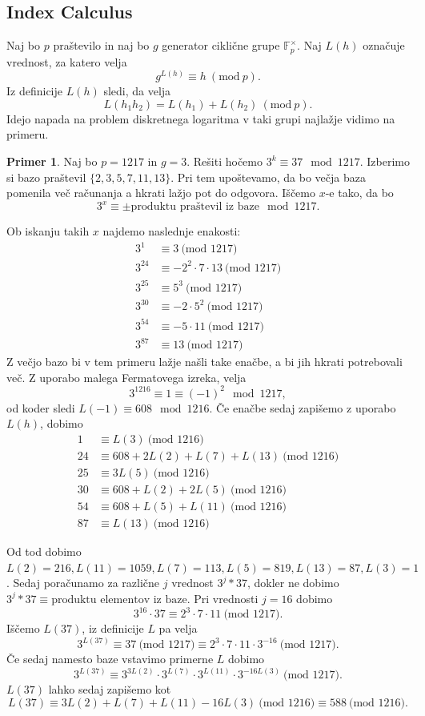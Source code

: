 \documentclass[12pt,a4paper,twoside]{article}
\theoremstyle{definition} %
\newtheorem{primer}[definicija]{Primer}
\theoremstyle{plain} %
\numberwithin{equation}{section}  %
\newcommand{\F}{\mathbb F}
\newcommand{\MOD}[1]{\ \text{(mod }{#1}\text{)}}
\begin{document}
\subsection{Index Calculus}
\label{IndexCalc}

Naj bo $p$ praštevilo in naj bo $g$ generator ciklične grupe $\F^{\times}_{p}$. Naj $L(h)$ označuje vrednost, za katero velja
$$g^{L(h)} \equiv h \ (\text{mod} \ p).$$
Iz definicije $L(h)$ sledi, da velja $$L(h_1h_2) = L(h_1)+L(h_2) \ (\text{mod} \ p).$$
Idejo napada na problem diskretnega logaritma v taki grupi najlažje vidimo na primeru.

\begin{primer}
Naj bo $p = 1217$ in $g= 3$. Rešiti hočemo $3^k \equiv 37 \mod 1217$. Izberimo si bazo praštevil $\{ 2,3,5,7,11,13 \}$. Pri tem upoštevamo, da bo večja baza pomenila več računanja a hkrati lažjo pot do odgovora. Iščemo $x$-e  tako, da bo
$$3^x \equiv \pm \text{produktu praštevil iz baze} \mod 1217.$$

Ob iskanju takih $x$ najdemo naslednje enakosti:
\begin{align}
3^1 &\equiv 3 \MOD{1217} \nonumber \\ 
3^{24}  &\equiv -2^2\cdot 7\cdot 13 \MOD{1217} \nonumber \\
3^{25}  &\equiv 5^3 \MOD{1217} \nonumber \\
3^{30}  &\equiv -2 \cdot 5^2 \MOD{1217} \nonumber \\
3^{54}  &\equiv -5\cdot 11 \MOD{1217} \nonumber \\
3^{87}  &\equiv 13 \MOD{1217} \nonumber
\end{align}
Z večjo bazo bi v tem primeru lažje našli take enačbe, a bi jih hkrati potrebovali več.
Z uporabo malega Fermatovega izreka, velja
$$3^{1216} \equiv 1 \equiv (-1)^2 \mod 1217, $$
od koder sledi $L(-1) \equiv 608 \mod 1216$.
Če enačbe sedaj zapišemo z uporabo $L(h)$, dobimo
\begin{align}
1 &\equiv L(3) \MOD{1216} \nonumber \\ 
24&\equiv 608 + 2L(2) + L(7) +L(13) \MOD{1216} \nonumber \\
25 &\equiv 3L(5) \MOD{1216} \nonumber \\
30 &\equiv 608+L(2)+2L(5) \MOD{1216} \nonumber \\
54 &\equiv 608+L(5)+L(11) \MOD{1216} \nonumber \\
87  &\equiv L(13) \MOD{1216}  \nonumber
\end{align}

Od tod dobimo $L(2) = 216, L(11)=1059,L(7) = 113,L(5) = 819,L(13) = 87,L(3)=1$.
Sedaj poračunamo za različne $j$ vrednost $3^j*37$, dokler ne dobimo $3^j*37 \equiv \text{produktu elementov iz baze}$.
Pri vrednosti $j=16$ dobimo
$$3^{16}\cdot 37 \equiv 2^3\cdot 7 \cdot 11 \MOD{1217}.$$
Iščemo $L(37)$, iz definicije $L$ pa velja
$$3^{L(37)} \equiv 37 \MOD{1217} \equiv 2^3\cdot 7 \cdot 11 \cdot 3^{-16}\MOD{1217}.$$
Če sedaj namesto baze vstavimo primerne $L$ dobimo
$$3^{L(37)} \equiv 3^{3L(2)}\cdot 3^{L(7)} \cdot 3^{L(11)} \cdot 3^{-16L(3)}\MOD{1217}.$$
$L(37)$ lahko sedaj zapišemo kot
$$L(37) \equiv 3L(2) +L(7)+L(11) - 16L(3) \MOD{1216} \equiv 588 \MOD{1216}.$$


\end{primer}
\end{document}
